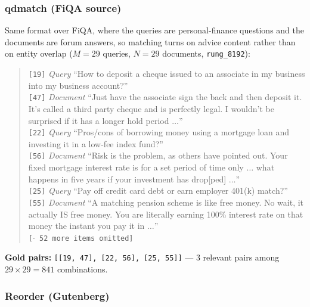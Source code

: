 \subsubsection{qdmatch (FiQA source)}

Same format over FiQA, where the queries are personal-finance questions and the documents are forum
answers, so matching turns on advice content rather than on entity overlap
($M{=}29$ queries, $N{=}29$ documents, \texttt{rung\_8192}):
\begin{quote}\small
\texttt{[19]} \emph{Query} ``How to deposit a cheque issued to an associate in my business into my
business account?''\\
\texttt{[47]} \emph{Document} ``Just have the associate sign the back and then deposit it. It's called
a third party cheque and is perfectly legal. I wouldn't be surprised if it has a longer hold period
$\dots$''\\
\texttt{[22]} \emph{Query} ``Pros/cons of borrowing money using a mortgage loan and investing it in a
low-fee index fund?''\\
\texttt{[56]} \emph{Document} ``Risk is the problem, as others have pointed out. Your fixed mortgage
interest rate is for a set period of time only $\dots$ what happens in five years if your investment
has drop[ped] $\dots$''\\
\texttt{[25]} \emph{Query} ``Pay off credit card debt or earn employer 401(k) match?''\\
\texttt{[55]} \emph{Document} ``A matching pension scheme is like free money. No wait, it actually IS
free money. You are literally earning 100\% interest rate on that money the instant you pay it in
$\dots$''\\
\texttt{[$\cdot$ 52 more items omitted]}
\end{quote}
\textbf{Gold pairs:} \texttt{[[19, 47], [22, 56], [25, 55]]} --- 3 relevant pairs among
$29 \times 29 = 841$ combinations.

\subsubsection{Reorder (Gutenberg)}

